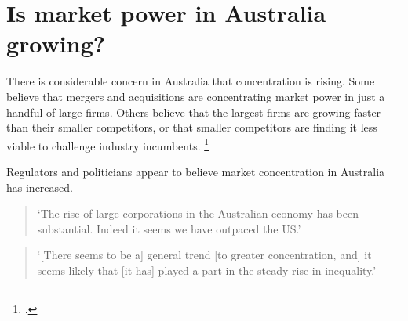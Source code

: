 \chapter{Is market power in Australia growing?\label{chap:trends}}

There is considerable concern in Australia that concentration is rising. Some believe that mergers and acquisitions are concentrating market power in just a handful of large firms. Others believe that the largest firms are growing faster than their smaller competitors, or that smaller competitors are finding it less viable to challenge industry incumbents.%
    \footcites{Janda_merger_2008}{IBISWorld_Bunnings_2015}{Bouris_BigBusiness_2015}

Regulators and politicians appear to believe market concentration in Australia has increased.

\begin{quote}
    `The rise of large corporations in the Australian economy has been substantial. Indeed it seems we have outpaced the US.'
    
\end{quote}

\begin{quote}
    `[There seems to be a] general trend [to greater concentration, and] it seems likely that [it has] played a part in the steady rise in inequality.'
    
\end{quote}

    


